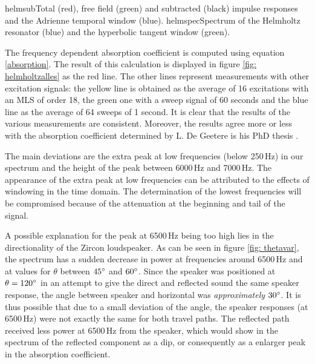   

	{helmsub}{Total (red), free field (green) and subtracted (black) impulse responses and the Adrienne temporal window (blue).}
	{helmspec}{Spectrum of the Helmholtz resonator (blue) and the hyperbolic tangent window (green).}




The frequency dependent absorption coefficient is computed using equation \ref{absorption}. The result of this calculation is displayed in figure \ref{fig: helmholtzalles} as the red line. The other lines represent measurements with other excitation signals: the yellow line is obtained as the average of 16 excitations with an MLS of order 18, the green one with a sweep signal of 60 seconds and the blue line as the average of 64 sweeps of 1 second. It is clear that the results of the various measurements are consistent. Moreover, the results agree more or less with the absorption coefficient determined by L. De Geetere is his PhD thesis \cite[p.84]{Geetere}. 

The main deviations are the extra peak at low frequencies (below 250\,Hz) in our spectrum and the height of the peak between 6000\,Hz and 7000\,Hz. The appearance of the extra peak at low frequencies can be attributed to the effects of windowing in the time domain. The determination of the lowest frequencies will be compromised because of the attenuation at the beginning and tail of the signal.

A possible explanation for the peak at 6500\,Hz being too high lies in the directionality of the Zircon loudspeaker. As can be seen in figure \ref{fig: thetavar}, the spectrum has a sudden decrease in power at frequencies around 6500\,Hz and at values for $\theta$ between $45^{\circ}$ and $60^{\circ}$. Since the speaker was positioned at $\theta = 120^{\circ}$ in an attempt to give the direct and reflected sound the same speaker response, the angle between speaker and horizontal was \emph{approximately} $30^{\circ}$. It is thus possible that due to a small deviation of the angle, the speaker responses (at 6500\,Hz) were not exactly the same for both travel paths. The reflected path received less power at 6500\,Hz from the speaker, which would show in the spectrum of the reflected component as a dip, or consequently as a enlarger peak in the absorption coefficient.


